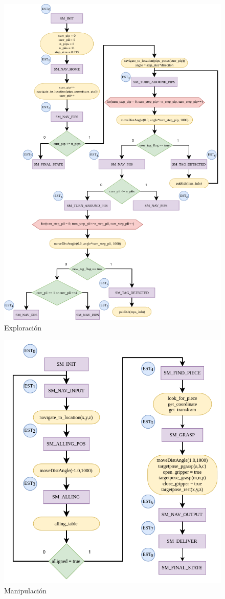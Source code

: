 \begin{figure}[ht]
    \centering
    \includegraphics[scale= 0.5]{Figures/Exploration_CT.png}
        \caption{Exploración}
        \label{fig:ASM_Exploración}
\end{figure}


\begin{figure}[ht]
    \centering
    \includegraphics[scale= 0.4]{Figures/Manipulacion_CT_Hor.png}
    \caption{Manipulación}
    \label{fig:ASM_Manipulación}
\end{figure}